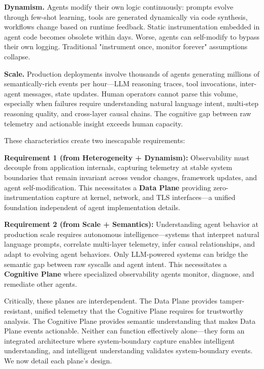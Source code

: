 \documentclass[sigplan,screen,9pt]{acmart}
\begin{document}
\textbf{Dynamism.} Agents modify their own logic continuously: prompts evolve through few-shot learning, tools are generated dynamically via code synthesis, workflows change based on runtime feedback. Static instrumentation embedded in agent code becomes obsolete within days. Worse, agents can self-modify to bypass their own logging. Traditional "instrument once, monitor forever" assumptions collapse.

\textbf{Scale.} Production deployments involve thousands of agents generating millions of semantically-rich events per hour—LLM reasoning traces, tool invocations, inter-agent messages, state updates. Human operators cannot parse this volume, especially when failures require understanding natural language intent, multi-step reasoning quality, and cross-layer causal chains. The cognitive gap between raw telemetry and actionable insight exceeds human capacity.

These characteristics create two inescapable requirements:

\textbf{Requirement 1 (from Heterogeneity + Dynamism):} Observability must decouple from application internals, capturing telemetry at stable system boundaries that remain invariant across vendor changes, framework updates, and agent self-modification. This necessitates a \textbf{Data Plane} providing zero-instrumentation capture at kernel, network, and TLS interfaces—a unified foundation independent of agent implementation details.

\textbf{Requirement 2 (from Scale + Semantics):} Understanding agent behavior at production scale requires autonomous intelligence—systems that interpret natural language prompts, correlate multi-layer telemetry, infer causal relationships, and adapt to evolving agent behaviors. Only LLM-powered systems can bridge the semantic gap between raw syscalls and agent intent. This necessitates a \textbf{Cognitive Plane} where specialized observability agents monitor, diagnose, and remediate other agents.

Critically, these planes are interdependent. The Data Plane provides tamper-resistant, unified telemetry that the Cognitive Plane requires for trustworthy analysis. The Cognitive Plane provides semantic understanding that makes Data Plane events actionable. Neither can function effectively alone—they form an integrated architecture where system-boundary capture enables intelligent understanding, and intelligent understanding validates system-boundary events. We now detail each plane's design.
\end{document}
